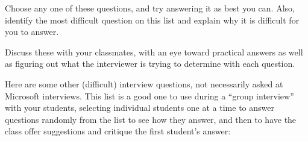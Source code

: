 Choose any one of these questions, and try answering it as best you can.  Also, identify the most difficult question on this list and explain why it is difficult for you to answer.

\vskip 50pt







Discuss these with your classmates, with an eye toward practical answers as well as figuring out what the interviewer is trying to determine with each question.







Here are some other (difficult) interview questions, not necessarily asked at Microsoft interviews.  This list is a good one to use during a ``group interview'' with your students, selecting individual students one at a time to answer questions randomly from the list to see how they answer, and then to have the class offer suggestions and critique the first student's answer:


